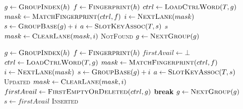 \documentclass[sigconf]{acmart}
\begin{document}
\begin{algorithm}[t]
  \caption{Metadata-guided probe (lookup path).}
  \label{alg:probe}
  \begin{algorithmic}[1]
      \State $g \gets \Call{GroupIndex}{h}$ 
      \State $f \gets \Call{Fingerprint}{h}$ 
      \Loop
        \State $ctrl \gets \Call{LoadCtrlWord}{T, g}$
        \State $mask \gets \Call{MatchFingerprint}{ctrl, f}$
          \State $i \gets \Call{NextLane}{mask}$
          \State $s \gets \Call{GroupBase}{g} + i$
          \State $a \gets \Call{SlotKeyAssoc}{T, s}$
            \State \Return $s$
          \EndIf
          \State $mask \gets \Call{ClearLane}{mask, i}$
        \EndWhile
          \State \Return \textsc{NotFound}
        \EndIf
        \State $g \gets \Call{NextGroup}{g}$
      \EndLoop
    \EndProcedure
  \end{algorithmic}
\end{algorithm}

\begin{algorithm}[t]
  \caption{Insert/update with tombstones and maintenance triggers.}
  \label{alg:put}
  \begin{algorithmic}[1]
      \State $g \gets \Call{GroupIndex}{h}$
      \State $f \gets \Call{Fingerprint}{h}$
      \State $firstAvail \gets \bot$ 
      \Loop
        \State $ctrl \gets \Call{LoadCtrlWord}{T, g}$
        \State $mask \gets \Call{MatchFingerprint}{ctrl, f}$
          \State $i \gets \Call{NextLane}{mask}$
          \State $s \gets \Call{GroupBase}{g} + i$
          \State $a \gets \Call{SlotKeyAssoc}{T, s}$
            \State {}
            \State \Return \textsc{Updated}
          \EndIf
          \State $mask \gets \Call{ClearLane}{mask, i}$
        \EndWhile
          \State $firstAvail \gets \Call{FirstEmptyOrDeleted}{ctrl, g}$
        \EndIf
          \State \textbf{break}
        \EndIf
        \State $g \gets \Call{NextGroup}{g}$
      \EndLoop
      \State $s \gets firstAvail$
      \State {} 
      \State {}
      \State {}
        \State {}
      \EndIf
      \State \Return \textsc{Inserted}
    \EndProcedure
  \end{algorithmic}
\end{algorithm}
\end{document}
